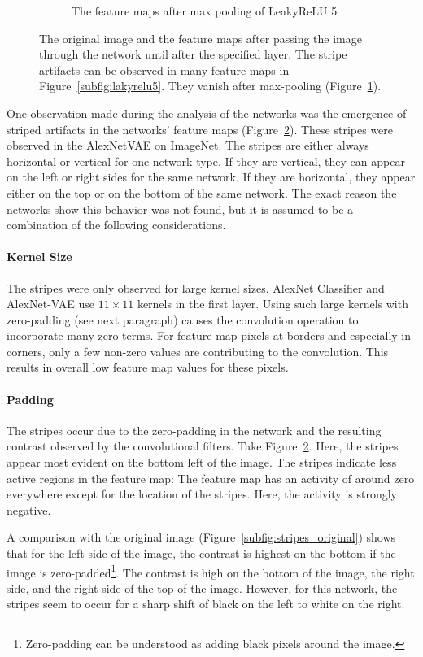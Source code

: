 \begin{figure}
\begin{subfigure}{0.3\textwidth}
        \caption{The feature maps after max pooling of LeakyReLU 5}
        \label{subfig:maxpool}
    \end{subfigure}
    \caption[Feature map stripes]{The original image and the feature maps after passing the image through the network until after the specified layer. The stripe artifacts can be observed in many feature maps in Figure~\ref{subfig:lakyrelu5}. They vanish after max-pooling (Figure~\ref{subfig:maxpool}).}
    \label{fig:stripes}
\end{figure}


One observation made during the analysis of the networks was the emergence of striped artifacts in the networks' feature maps (Figure~\ref{fig:stripes}).
These stripes were observed in the AlexNetVAE on ImageNet.
The stripes are either always horizontal or vertical for one network type.
If they are vertical, they can appear on the left or right sides for the same network.
If they are horizontal, they appear either on the top or on the bottom of the same network.
The exact reason the networks show this behavior was not found, but it is assumed to be a combination of the following considerations.

\paragraph{Kernel Size}
The stripes were only observed for large kernel sizes.
AlexNet Classifier and AlexNet-\ac{VAE} use $11\times 11$ kernels in the first layer.
Using such large kernels with zero-padding (see next paragraph) causes the convolution operation to incorporate many zero-terms.
For feature map pixels at borders and especially in corners, only a few non-zero values are contributing to the convolution.
This results in overall low feature map values for these pixels.

\paragraph{Padding}
The stripes occur due to the zero-padding in the network and the resulting contrast observed by the convolutional filters.
Take Figure~\ref{fig:stripes}.
Here, the stripes appear most evident on the bottom left of the image.
The stripes indicate less active regions in the feature map: The feature map has an activity of around zero everywhere except for the location of the stripes.
Here, the activity is strongly negative.

A comparison with the original image (Figure~\ref{subfig:stripes_original}) shows that for the left side of the image, the contrast is highest on the bottom if the image is zero-padded\footnote{Zero-padding can be understood as adding black pixels around the image.}.
The contrast is high on the bottom of the image, the right side, and the right side of the top of the image.
However, for this network, the stripes seem to occur for a sharp shift of black on the left to white on the right.

